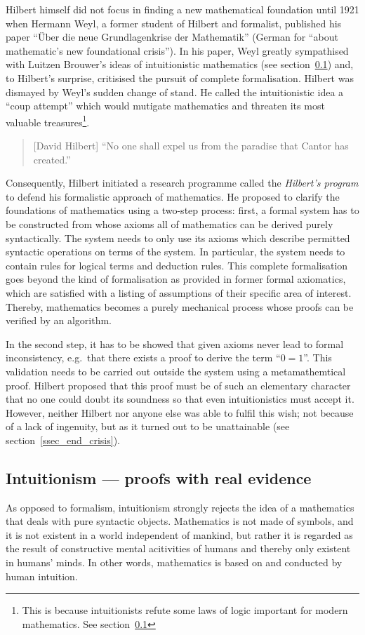\documentclass[hidelinks]{article}
\begin{document}
Hilbert himself did not focus in finding a new mathematical foundation until 1921 when Hermann Weyl, a former student of Hilbert and formalist, published his paper ``Über die neue Grundlagenkrise der Mathematik'' (German for ``about mathematic's new foundational crisis''). In his paper, Weyl greatly sympathised with Luitzen Brouwer's ideas of intuitionistic mathematics (see section~\ref{ssec_intuitionism}) and, to Hilbert's surprise, critisised the pursuit of complete formalisation. Hilbert was dismayed by Weyl's sudden change of stand. He called the intuitionistic idea a ``coup attempt'' which would mutigate mathematics and threaten its most valuable treasures\footnote{This is because intuitionists refute some laws of logic important for modern mathematics. See section~\ref{ssec_intuitionism}}.\cite{hilbert_coup}
\begin{quote}[David Hilbert]
``No one shall expel us from the paradise that Cantor has created.''\cite{hilbert_paradise}
\end{quote}
Consequently, Hilbert initiated a research programme called the \textit{Hilbert's program} to defend his formalistic approach of mathematics. He proposed to clarify the foundations of mathematics using a two-step process: first, a formal system has to be constructed from whose axioms all of mathematics can be derived purely syntactically. The system needs to only use its axioms which describe permitted syntactic operations on terms of the system. In particular, the system needs to contain rules for logical terms and deduction rules. This complete formalisation goes beyond the kind of formalisation as provided in former formal axiomatics, which are satisfied with a listing of assumptions of their specific area of interest. Thereby, mathematics becomes a purely mechanical process whose proofs can be verified by an algorithm.

In the second step, it has to be showed that given axioms never lead to formal inconsistency, e.g.\ that there exists a proof to derive the term ``$0=1$''. This validation needs to be carried out outside the system using a metamathemtical proof. Hilbert proposed that this proof must be of such an elementary character that no one could doubt its soundness so that even intuitionistics must accept it. However, neither Hilbert nor anyone else was able to fulfil this wish; not because of a lack of ingenuity, but as it turned out to be unattainable (see section~\ref{ssec_end_crisis}).

\subsection{Intuitionism --- proofs with real evidence}\label{ssec_intuitionism}
As opposed to formalism, intuitionism strongly rejects the idea of a mathematics that deals with pure syntactic objects. Mathematics is not made of symbols, and it is not existent in a world independent of mankind, but rather it is regarded as the result of constructive mental acitivities of humans and thereby only existent in humans' minds. In other words, mathematics is based on and conducted by human intuition.
\end{document}
